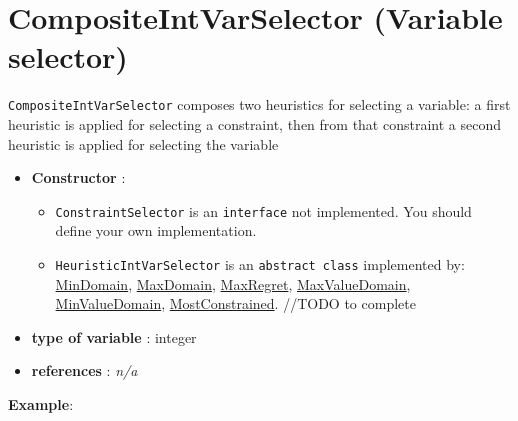 \section{CompositeIntVarSelector (Variable selector)}\label{compositeintvarselector:compositeintvarselectorvarselector}\hypertarget{compositeintvarselector:compositeintvarselectorvarselector}{}
\begin{notedef}
  \texttt{CompositeIntVarSelector} composes two heuristics for selecting a variable: a first heuristic is applied for selecting a constraint, then from that constraint a second heuristic is applied for selecting the variable
  \end{notedef}

\begin{itemize}
	\item \textbf{Constructor} :
	\begin{itemize}
\item \texttt{ConstraintSelector} is an \texttt{interface} not implemented. You should define your own implementation. 

\item \texttt{HeuristicIntVarSelector} is an \texttt{abstract class}  implemented by: \hyperlink{mindomain:mindomainvarselector}{MinDomain}, \hyperlink{maxdomain:maxdomainvarselector}{MaxDomain}, \hyperlink{maxregret:maxregretvarselector}{MaxRegret}, \hyperlink{maxvaldomain:maxvaldomainvarselector}{MaxValueDomain}, \hyperlink{minvaldomain:minvaldomainvarselector}{MinValueDomain}, \hyperlink{mostconstrained:mostconstrainedvarselector}{MostConstrained}. //TODO to complete

\end{itemize}

	\item \textbf{type of variable} : integer
	\item \textbf{references} : \emph{n/a}
\end{itemize}

\textbf{Example}:
%

